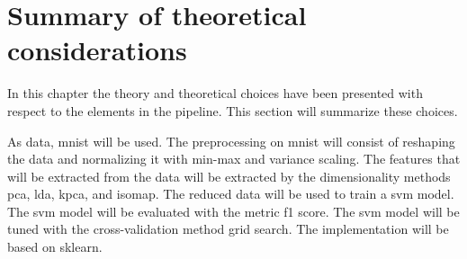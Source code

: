 \section{Summary of theoretical considerations}\label{sec:theory-choice-summary}
In this chapter the theory and theoretical choices have been presented with respect to the elements in the pipeline. This section will summarize these choices.


As data, \gls{mnist} will be used. The preprocessing on \gls{mnist} will consist of reshaping the data and normalizing it with min-max and variance scaling. The features that will be extracted from the data will be extracted by the dimensionality methods \gls{pca}, \gls{lda}, \gls{kpca}, and \gls{isomap}. The reduced data will be used to train a \gls{svm} model. The \gls{svm} model will be evaluated with the metric f1 score. The \gls{svm} model will be tuned with the cross-validation method grid search. The implementation will be based on \gls{sklearn}.